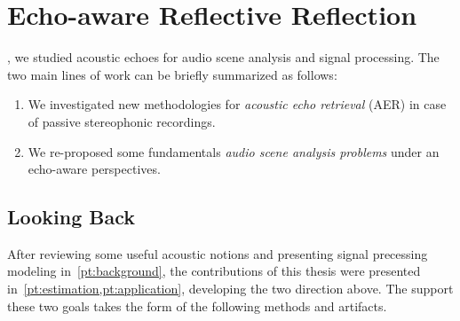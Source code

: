 \chapter{Echo-aware Reflective Reflection}\label{ch:conclusion}


\vspace{-2.5em}
, we studied acoustic echoes for audio scene analysis and signal processing.
The two main lines of work can be briefly summarized as follows:
\begin{enumerate}[label=\Alph*.]
    \item We investigated new methodologies for \textit{acoustic echo retrieval} (AER) in case of passive stereophonic recordings.
    \item We re-proposed some fundamentals \textit{audio scene analysis problems} under an echo-aware perspectives.
\end{enumerate}

\section{Looking Back}
After reviewing some useful acoustic notions and presenting signal precessing modeling in~\cref{pt:background}, the contributions of this thesis were presented in~\cref{pt:estimation,pt:application},
developing the two direction above. The support these two goals takes the form of the following methods and artifacts.

